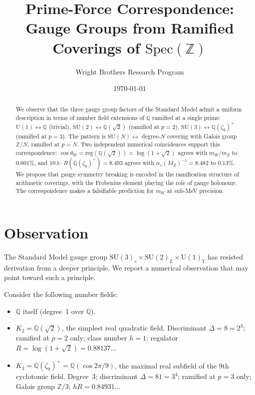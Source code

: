 \documentclass[aps,prl,twocolumn,superscriptaddress,nofootinbib]{revtex4-2}
\newcommand{\Spec}{\mathrm{Spec}}
\newcommand{\reg}{\mathrm{reg}}
\newcommand{\SU}{\mathrm{SU}}
\newcommand{\U}{\mathrm{U}}
\begin{document}
\title{Prime-Force Correspondence:\\
Gauge Groups from Ramified Coverings of $\Spec(\mathbb{Z})$}

\author{Wright Brothers Research Program}

\date{\today}

\begin{abstract}
We observe that the three gauge group factors of the Standard Model
admit a uniform description in terms of number field extensions of
$\mathbb{Q}$ ramified at a single prime:
$\U(1)\leftrightarrow\mathbb{Q}$ (trivial),
$\SU(2)\leftrightarrow\mathbb{Q}(\sqrt{2})$ (ramified at $p{=}2$),
$\SU(3)\leftrightarrow\mathbb{Q}(\zeta_9)^+$ (ramified at $p{=}3$).
The pattern is $\SU(N)\leftrightarrow$ degree-$N$ covering with
Galois group $\mathbb{Z}/N$, ramified at $p{=}N$.  Two independent
numerical coincidences support this correspondence:
$\cos\theta_W=\reg(\mathbb{Q}(\sqrt{2}))=\log(1{+}\sqrt{2})$
agrees with $m_W/m_Z$ to $0.001\%$, and
$10\,h\!\cdot\!R(\mathbb{Q}(\zeta_9)^+)=8.493$ agrees with
$\alpha_s(M_Z)^{-1}=8.482$ to $0.13\%$.  We propose that gauge
symmetry breaking is encoded in the ramification structure of
arithmetic coverings, with the Frobenius element playing the role
of gauge holonomy.  The correspondence makes a falsifiable prediction
for $m_W$ at sub-MeV precision.
\end{abstract}

\maketitle

\section{Observation}

The Standard Model gauge group $\SU(3)_c\times\SU(2)_L\times\U(1)_Y$
has resisted derivation from a deeper principle.  We report a
numerical observation that may point toward such a principle.

Consider the following number fields:
\begin{itemize}
\item $\mathbb{Q}$ itself (degree~1 over $\mathbb{Q}$).
\item $K_2=\mathbb{Q}(\sqrt{2})$, the simplest real quadratic field.
  Discriminant $\Delta=8=2^3$; ramified at $p=2$ only; class number
  $h=1$; regulator $R=\log(1{+}\sqrt{2})=0.88137\ldots$
\item $K_3=\mathbb{Q}(\zeta_9)^+=\mathbb{Q}(\cos 2\pi/9)$, the
  maximal real subfield of the 9th cyclotomic field.  Degree~3;
  discriminant $\Delta=81=3^4$; ramified at $p=3$ only; Galois group
  $\mathbb{Z}/3$; $hR=0.84931\ldots$
\end{itemize}
\end{document}
